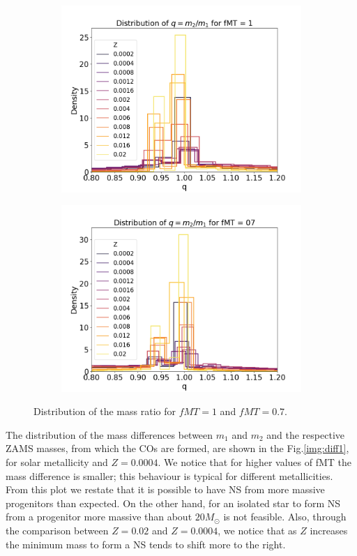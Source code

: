 \documentclass[preprint,12pt]{elsarticle}
\begin{document}
\begin{figure}[h]
    \centering
    \begin{subfigure}[t]{0.45\textwidth}
        \centering
        \includegraphics[width=1\textwidth]{Images/qfMT1.png}
    \end{subfigure}
    \begin{subfigure}[t]{0.45\textwidth}
        \centering    
        \includegraphics[width=1\textwidth]{Images/qfMT07.png}
    \end{subfigure}
\caption{Distribution of the mass ratio for $fMT=1$ and $fMT=0.7$.}
\label{img:q}
\end{figure}
\newpage
The distribution of the mass differences between $m_1$ and $m_2$ and the respective ZAMS masses, from which the COs are formed, are shown in the Fig.\ref{img:diff1}, for solar metallicity and $Z=0.0004$. We notice that for higher values of fMT the mass difference is smaller; this behaviour is typical for different metallicities. From this plot we restate that it is possible to have NS from more massive progenitors than expected. On the other hand, for an isolated star to form NS from a progenitor more massive than about $20M_{\odot}$ is not feasible. Also, through the comparison between $Z=0.02$ and $Z=0.0004$, we notice that as $Z$ increases the minimum mass to form a NS tends to shift more to the right. 
\end{document}
